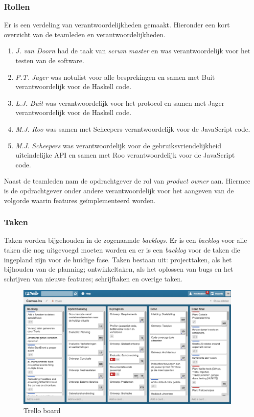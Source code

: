 \subsubsection{Rollen}
Er is een verdeling van verantwoordelijkheden gemaakt. Hieronder een kort overzicht van de teamleden en verantwoordelijkheden.
\begin{enumerate}
    \item \emph{J. van Doorn} had de taak van \emph{scrum master} en was verantwoordelijk voor het testen van de software.
    \item \emph{P.T. Jager} was notulist voor alle besprekingen en samen met Buit verantwoordelijk voor de Haskell code.
    \item \emph{L.J. Buit} was verantwoordelijk voor het protocol en samen met Jager verantwoordelijk voor de Haskell code.
    \item \emph{M.J. Roo} was samen met Scheepers verantwoordelijk voor de JavaScript code.
    \item \emph{M.J. Scheepers} was verantwoordelijk voor de gebruiksvriendelijkheid uiteindelijke API en samen met Roo verantwoordelijk voor de JavaScript code.
\end{enumerate}
Naast de teamleden nam de opdrachtgever de rol van \emph{product owner} aan. Hiermee is de opdrachtgever onder andere verantwoordelijk voor het aangeven van de volgorde waarin features ge\"implementeerd worden.

\subsubsection{Taken}
Taken worden bijgehouden in de zogenaamde \emph{backlogs}. Er is een \emph{backlog} voor alle taken die nog uitgevoegd moeten worden en er is een \emph{backlog} voor de taken die ingepland zijn voor de huidige fase. Taken bestaan uit: projecttaken, als het bijhouden van de planning; ontwikkeltaken, als het oplossen van bugs en het schrijven van nieuwe features; schrijftaken en overige taken.

\begin{figure}[H]
\begin{center}
\includegraphics[keepaspectratio,width=\textwidth]{./images/trello.png}
\caption{Trello board}
\label{fig:trello}
\end{center}
\end{figure}

